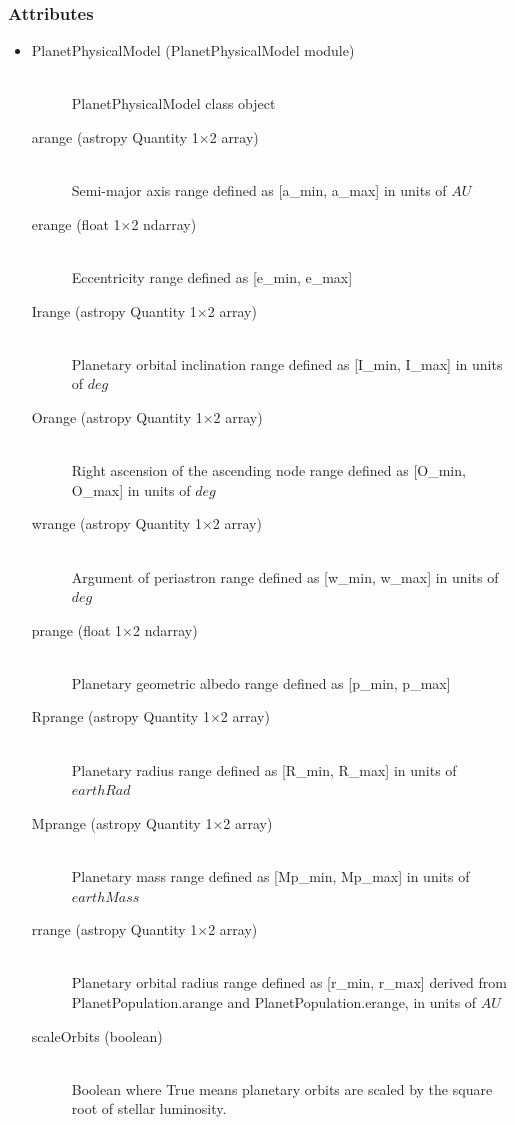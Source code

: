 \documentclass[cleanfoot]{asme2ej}
\begin{document}
\subsubsection*{Attributes}
\begin{itemize}
\item
\begin{description}
    \item[PlanetPhysicalModel (PlanetPhysicalModel module)] \hfill \\ PlanetPhysicalModel class object
    \item[arange (astropy Quantity 1$\times$2 array)] \hfill \\ Semi-major axis range defined as [a\_min, a\_max] in units of $ AU $
    \item[erange (float 1$\times$2 ndarray)] \hfill \\ Eccentricity range defined as [e\_min, e\_max]
    \item[Irange (astropy Quantity 1$\times$2 array)] \hfill \\ Planetary orbital inclination range defined as [I\_min, I\_max] in units of $ deg $
    \item[Orange (astropy Quantity 1$\times$2 array)] \hfill \\ Right ascension of the ascending node range defined as [O\_min, O\_max] in units of $ deg $
    \item[wrange (astropy Quantity 1$\times$2 array)] \hfill \\ Argument of periastron range defined as [w\_min, w\_max] in units of $ deg $
    \item[prange (float 1$\times$2 ndarray)] \hfill \\ Planetary geometric albedo range defined as [p\_min, p\_max]
    \item[Rprange (astropy Quantity 1$\times$2 array)] \hfill \\ Planetary radius range defined as [R\_min, R\_max] in units of $earthRad$
    \item[Mprange (astropy Quantity 1$\times$2 array)] \hfill \\ Planetary mass range defined as [Mp\_min, Mp\_max] in units of $earthMass$
    \item[rrange (astropy Quantity 1$\times$2 array)] \hfill \\ Planetary orbital radius range defined as [r\_min, r\_max] derived from PlanetPopulation.arange and PlanetPopulation.erange, in units of $ AU $
    \item [scaleOrbits (boolean)] \hfill \\ Boolean where True means planetary orbits are scaled by the square root of stellar luminosity.

\end{description}
\end{itemize}
\end{document}
